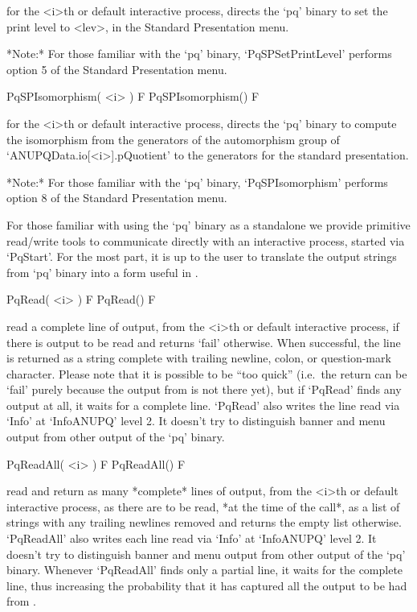 for the <i>th or default interactive {\ANUPQ} process, directs  the  `pq'
binary to set the print level to  <lev>,  in  the  Standard  Presentation
menu.

*Note:* For those familiar  with  the  `pq'  binary,  `PqSPSetPrintLevel'
performs option 5 of the Standard Presentation menu.

\>PqSPIsomorphism( <i> ) F
\>PqSPIsomorphism() F

for the <i>th or default interactive {\ANUPQ} process, directs  the  `pq'
binary to compute the isomorphism from the generators of the automorphism
group of `ANUPQData.io[<i>].pQuotient' to the generators for the standard
presentation.

*Note:* For  those  familiar  with  the  `pq'  binary,  `PqSPIsomorphism'
performs option 8 of the Standard Presentation menu.


For those familiar with using the `pq' binary as a standalone we  provide
primitive read/write tools to communicate directly  with  an  interactive
{\ANUPQ} process, started via `PqStart'. For the most part, it is  up  to
the user to translate the output strings from `pq'  binary  into  a  form
useful in {\GAP}.

\>PqRead( <i> ) F
\>PqRead() F

read a complete line of  {\ANUPQ}  output,  from  the  <i>th  or  default
interactive {\ANUPQ} process, if there is output to be read  and  returns
`fail' otherwise. When successful, the  line  is  returned  as  a  string
complete with trailing newline, colon, or question-mark character. Please
note that it is possible to be ``too  quick''  (i.e.~the  return  can  be
`fail' purely because the output from {\ANUPQ} is not there yet), but  if
`PqRead' finds any output at all, it waits for a complete line.  `PqRead'
also writes the line read via `Info' at `InfoANUPQ' level 2.  It  doesn't
try to distinguish banner and menu output from other output of  the  `pq'
binary.

\>PqReadAll( <i> ) F
\>PqReadAll() F

read and return as many *complete* lines of  {\ANUPQ}  output,  from  the
<i>th or default interactive {\ANUPQ} process, as there are to  be  read,
*at the time of the call*,  as  a  list  of  strings  with  any  trailing
newlines removed and returns the empty list otherwise.  `PqReadAll'  also
writes each line read via `Info' at `InfoANUPQ' level 2. It  doesn't  try
to distinguish banner and menu output  from  other  output  of  the  `pq'
binary. Whenever `PqReadAll' finds only a partial line, it waits for  the
complete line, thus increasing the probability that it has  captured  all
the output to be had from {\ANUPQ}.

